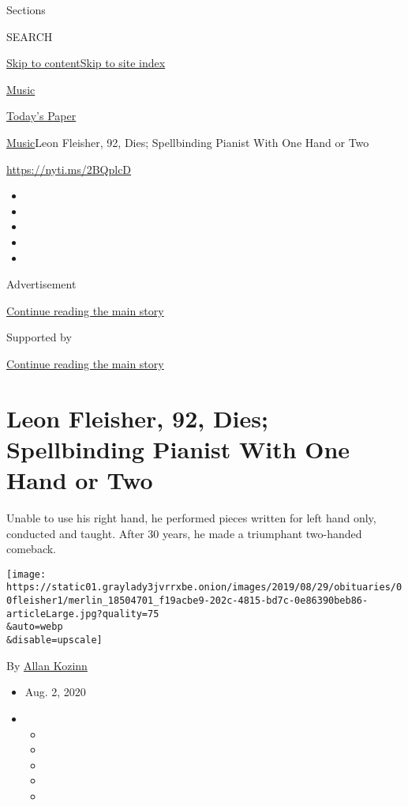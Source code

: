 Sections

SEARCH

\protect\hyperlink{site-content}{Skip to
content}\protect\hyperlink{site-index}{Skip to site index}

\href{https://www.nytimes3xbfgragh.onion/section/arts/music}{Music}

\href{https://myaccount.nytimes3xbfgragh.onion/auth/login?response_type=cookie\&client_id=vi}{}

\href{https://www.nytimes3xbfgragh.onion/section/todayspaper}{Today's
Paper}

\href{/section/arts/music}{Music}\textbar{}Leon Fleisher, 92, Dies;
Spellbinding Pianist With One Hand or Two

\url{https://nyti.ms/2BQplcD}

\begin{itemize}
\item
\item
\item
\item
\item
\end{itemize}

Advertisement

\protect\hyperlink{after-top}{Continue reading the main story}

Supported by

\protect\hyperlink{after-sponsor}{Continue reading the main story}

\hypertarget{leon-fleisher-92-dies-spellbinding-pianist-with-one-hand-or-two}{%
\section{Leon Fleisher, 92, Dies; Spellbinding Pianist With One Hand or
Two}\label{leon-fleisher-92-dies-spellbinding-pianist-with-one-hand-or-two}}

Unable to use his right hand, he performed pieces written for left hand
only, conducted and taught. After 30 years, he made a triumphant
two-handed comeback.

\texttt{[image: https://static01.graylady3jvrrxbe.onion/images/2019/08/29/obituaries/00fleisher1/merlin\_18504701\_f19acbe9-202c-4815-bd7c-0e86390beb86-articleLarge.jpg?quality=75\\\&auto=webp\\\&disable=upscale]}

By \href{https://www.nytimes3xbfgragh.onion/by/allan-kozinn}{Allan
Kozinn}

\begin{itemize}
\item
  Aug. 2, 2020
\item
  \begin{itemize}
  \item
  \item
  \item
  \item
  \item
  \end{itemize}
\end{itemize}

